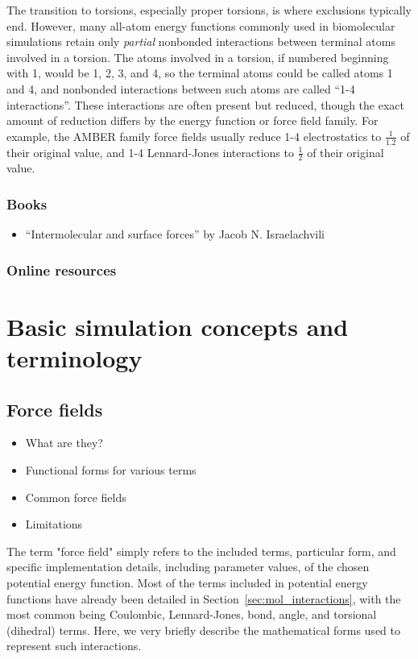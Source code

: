 \documentclass[9pt,bestpractices]{livecoms}
\begin{document}
The transition to torsions, especially proper torsions, is where exclusions
typically end.  However, many all-atom energy functions commonly used in
biomolecular simulations retain only \emph{partial} nonbonded
interactions between terminal atoms involved in a torsion.  The atoms
involved in a torsion, if numbered beginning with 1, would be 1, 2, 3,
and 4, so the terminal atoms could be called atoms 1 and 4, and
nonbonded interactions between such atoms are called ``1-4
interactions''.  These interactions are often present but reduced,
though the exact amount of reduction differs by the energy function or
force field family.  For example, the AMBER family force fields usually
reduce 1-4 electrostatics to $\frac{1}{1.2}$ of their original value,
and 1-4 Lennard-Jones interactions to $\frac{1}{2}$ of their original
value.


\subsubsection{Books}
\begin{itemize}
\item ``Intermolecular and surface forces'' by Jacob N. Israelachvili
\end{itemize}
\subsubsection{Online resources}

\section{Basic simulation concepts and terminology}

\subsection{Force fields}
\label{sec:force_fields}
\begin{itemize}
\item What are they?
\item Functional forms for various terms
\item Common force fields
\item Limitations
\end{itemize}

The term "force field" simply refers to the included terms, particular form,
and specific implementation details, including parameter values, of the 
chosen potential energy function. Most of the terms included in potential energy functions have already been detailed in Section~\ref{sec:mol_interactions}, with the most common being Coulombic, Lennard-Jones, bond, angle, and torsional (dihedral) terms. 
Here, we very briefly describe the mathematical forms used to represent such interactions.
\end{document}
